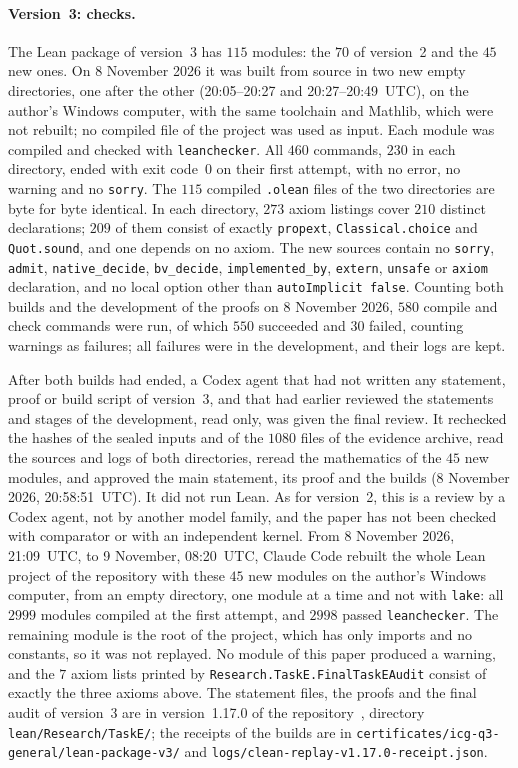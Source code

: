 \documentclass[11pt]{article}
\theoremstyle{remark}
\newcommand{\repoversion}{1.17.0}
\begin{document}
\paragraph{Version~3: checks.}
The Lean package of version~3 has $115$ modules: the $70$ of version~2 and the $45$
new ones. On 8 November 2026 it was built from source in two new empty directories,
one after the other (20:05--20:27 and 20:27--20:49~UTC), on the author's Windows
computer, with the same toolchain and Mathlib, which were not rebuilt; no compiled
file of the project was used as input. Each module was compiled and checked with
\texttt{leanchecker}. All $460$ commands, $230$ in each directory, ended with exit
code~$0$ on their first attempt, with no error, no warning and no \texttt{sorry}.
The $115$ compiled \texttt{.olean} files of the two directories are byte for byte
identical. In each directory, $273$ axiom listings cover $210$ distinct
declarations; $209$ of them consist of exactly \texttt{propext},
\texttt{Classical.choice} and \texttt{Quot.sound}, and one depends on no axiom.
The new sources contain no \texttt{sorry}, \texttt{admit},
\texttt{native\_decide}, \texttt{bv\_decide}, \texttt{implemented\_by},
\texttt{extern}, \texttt{unsafe} or \texttt{axiom} declaration, and no local option
other than \texttt{autoImplicit false}. Counting both builds and the development of
the proofs on 8 November 2026, $580$ compile and check commands were run, of which
$550$ succeeded and $30$ failed, counting warnings as failures; all failures were in
the development, and their logs are kept.

After both builds had ended, a Codex agent that had not written any statement,
proof or build script of version~3, and that had earlier reviewed the statements and
stages of the development, read only, was given the final review. It rechecked the
hashes of the sealed inputs and of the $1080$ files of the evidence archive, read the
sources and logs of both directories, reread the mathematics of the $45$ new
modules, and approved the main statement, its proof and the builds
(8 November 2026, 20:58:51~UTC). It did not run Lean. As for version~2, this is a
review by a Codex agent, not by another model family, and the paper has not been
checked with comparator or with an independent kernel.
From 8 November 2026, 21:09~UTC, to 9 November, 08:20~UTC, Claude Code rebuilt
the whole Lean project of the repository with these $45$ new modules on the
author's Windows computer, from an empty directory, one module at a time and not
with \texttt{lake}: all $2999$ modules compiled at the first attempt, and $2998$
passed \texttt{leanchecker}. The remaining module is the root of the project, which
has only imports and no constants, so it was not replayed. No module of this paper
produced a warning, and the $7$ axiom lists printed by
\texttt{Research.TaskE.FinalTaskEAudit} consist of exactly the three axioms above.
The statement files, the proofs and the final audit of version~3 are in
version~\repoversion{} of the repository~\cite{repo}, directory
\texttt{lean/Research/TaskE/}; the receipts of the builds are in
\texttt{certificates/\allowbreak icg-q3-general/\allowbreak lean-package-v3/} and
\texttt{logs/\allowbreak clean-replay-v\repoversion-receipt.json}.
\end{document}
